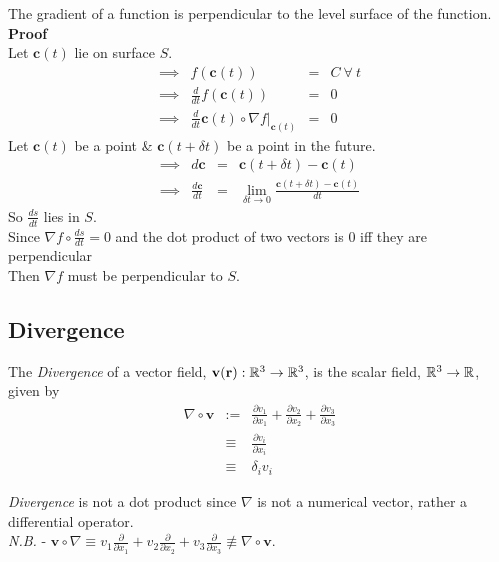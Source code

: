 \documentclass[11pt,a4paper]{article}
\begin{document}
The gradient of a function is perpendicular to the level surface of the function.\\
\textbf{Proof}\\
Let $\textbf{c}(t)$ lie on surface $S$.\\
\[\begin{array}{rrcl}
\implies&f(\textbf{c}(t))&=&C\ \forall\ t\\
\implies&\frac{d}{dt}f(\textbf{c}(t))&=&0\\
\implies&\frac{d}{dt}\textbf{c}(t)\circ\nabla f|_{\textbf{c}(t)}&=&0
\end{array}\]
Let $\textbf{c}(t)$ be a point \& $\textbf{c}(t+\delta t)$ be a point in the future.
\[\begin{array}{rrcl}
\implies&d\textbf{c}&=&\textbf{c}(t+\delta t)-\textbf{c}(t)\\
\implies&\frac{d\textbf{c}}{dt}&=&\lim_{\delta t \to 0}\frac{\textbf{c}(t+\delta t)-\textbf{c}(t)}{dt}
\end{array}\]
So $\frac{ds}{dt}$ lies in $S$.\\
Since $\nabla f\circ \frac{ds}{dt}=0$ and the dot product of two vectors is $0$ iff they are perpendicular\\
Then $\nabla f$ must be perpendicular to $S$.

\subsection{Divergence}

The \textit{Divergence} of a vector field, $\textbf{v}(\textbf{r}):\mathbb{R}^3\to\mathbb{R}^3$, is the scalar field, $\mathbb{R}^3\to\mathbb{R}$, given by
\[\begin{array}{rcl}
\nabla\circ\textbf{v}&:=&\frac{\partial v_1}{\partial x_1}+\frac{\partial v_2}{\partial x_2}+\frac{\partial v_3}{\partial x_3}\\
&\equiv& \frac{\partial v_i}{\partial x_i}\\
&\equiv& \delta_iv_i
\end{array}\]

\textit{Divergence} is not a dot product since $\nabla$ is not a numerical vector, rather a differential operator.\\
\textit{N.B.} - $\textbf{v}\circ\nabla\equiv v_1\frac{\partial}{\partial x_1}+v_2\frac{\partial}{\partial x_2}+v_3\frac{\partial}{\partial x_3}\not\equiv\nabla\circ\textbf{v}$.\\
\end{document}
